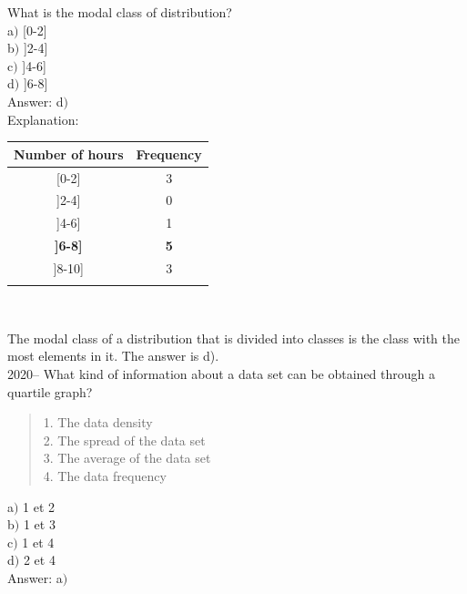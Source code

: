 \documentclass[letterpaper, 12pt]{article}
\begin{document}
What is the modal class of distribution?\\

a$)$ [0-2]\\ [2mm]
b$)$ ]2-4]\\[2mm]
c$)$ ]4-6]\\[2mm]
d$)$ ]6-8]\\

Answer: d$)$\\

Explanation:\\
\begin{center}
 \begin{tabular}{|c|c|} \hline
{\bf Number of hours} & {\bf Frequency}  \\ \hline \hline

[0-2] & 3 \\ \hline
]2-4] & 0 \\ \hline
]4-6] & 1 \\ \hline
\textbf{]6-8]} & \textbf{5} \\ \hline
]8-10] & 3 \\ \hline
\multicolumn{2}{c}{}\\
\end{tabular}\\
\end{center}
The modal class of a distribution that is divided into classes is the class with the most elements in it. The answer is d).\\


2020-- What kind of information about a data set can be obtained through a quartile graph?  \\

\begin{quote}
1. The data density \\
2. The spread of the data set\\
3. The average of the data set\\
4. The data frequency\\
\end{quote}

a$)$ 1 et 2\\
b$)$ 1 et 3\\
c$)$ 1 et 4\\
d$)$ 2 et 4\\

Answer: a$)$\\
\end{document}
